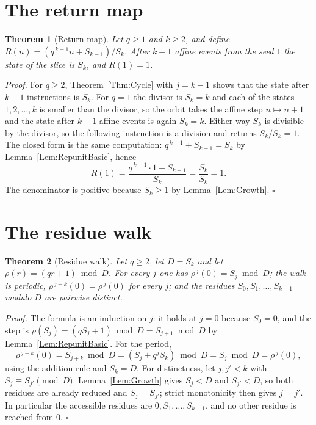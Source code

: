 \documentclass[11pt,letterpaper]{article}
\newtheorem{theorem}{Theorem}
\newenvironment{proof}{\noindent\textit{Proof.}}{\hfill\(\square\)}
\begin{document}
\section{The return map}

\begin{theorem}[Return map]\label{Thm:Return}
Let \(q\ge1\) and \(k\ge2\), and define \(R(n)=(q^{\,k-1}n+S_{k-1})/S_k\).
After \(k-1\) affine events from the seed \(1\) the state of the slice is
\(S_k\), and \(R(1)=1\).
\end{theorem}

\begin{proof}
For \(q\ge2\), Theorem~\ref{Thm:Cycle} with \(j=k-1\) shows that the
state after \(k-1\) instructions is \(S_k\). For \(q=1\) the divisor is
\(S_k=k\) and each of the states \(1,2,\dots,k\) is smaller than the divisor,
so the orbit takes the affine step \(n\mapsto n+1\) and the state after
\(k-1\) affine events is again \(S_k=k\). Either way \(S_k\) is divisible by
the divisor, so the following instruction is a division and returns
\(S_k/S_k=1\). The closed form is the same computation: \(q^{\,k-1}+S_{k-1}=S_k\) by
Lemma~\ref{Lem:RepunitBasic}, hence
\[
R(1)=\frac{q^{\,k-1}\cdot1+S_{k-1}}{S_k}=\frac{S_k}{S_k}=1.
\]
The denominator is positive because \(S_k\ge1\) by Lemma~\ref{Lem:Growth}.
\end{proof}

\section{The residue walk}

\begin{theorem}[Residue walk]\label{Thm:ResidueWalk}
Let \(q\ge2\), let \(D=S_k\) and let \(\rho(r)=(qr+1)\bmod D\). For every
\(j\) one has \(\rho^{\,j}(0)=S_j\bmod D\); the walk is periodic,
\(\rho^{\,j+k}(0)=\rho^{\,j}(0)\) for every \(j\); and the residues
\(S_0,S_1,\dots,S_{k-1}\) modulo \(D\) are pairwise distinct.
\end{theorem}

\begin{proof}
The formula is an induction on \(j\): it holds at \(j=0\) because
\(S_0=0\), and the step is \(\rho(S_j)=(qS_j+1)\bmod D=S_{j+1}\bmod D\) by
Lemma~\ref{Lem:RepunitBasic}. For the period,
\[
\rho^{\,j+k}(0)=S_{j+k}\bmod D=\left(S_j+q^jS_k\right)\bmod D=S_j\bmod D
=\rho^{\,j}(0),
\]
using the addition rule and \(S_k=D\). For distinctness, let \(j,j'<k\) with
\(S_j\equiv S_{j'}\pmod D\). Lemma~\ref{Lem:Growth} gives \(S_j<D\) and
\(S_{j'}<D\), so both residues are already reduced and \(S_j=S_{j'}\);
strict monotonicity then gives \(j=j'\). In particular the accessible
residues are \(0,S_1,\dots,S_{k-1}\), and no other residue is reached from
\(0\).
\end{proof}
\end{document}
